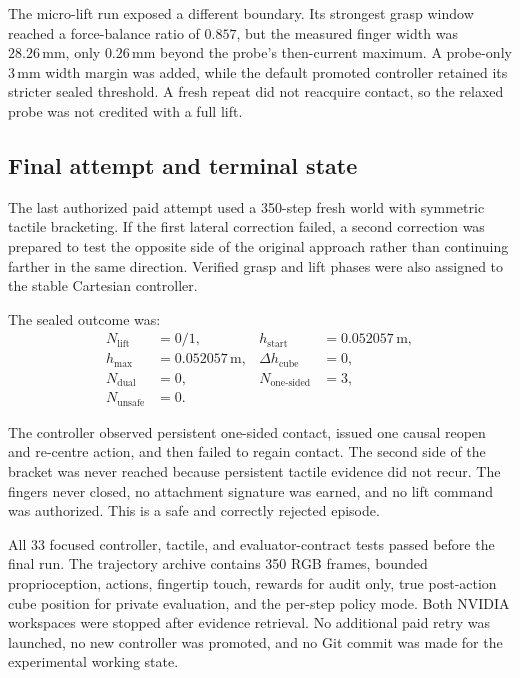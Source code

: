 The micro-lift run exposed a different boundary.  Its strongest grasp window
reached a force-balance ratio of $0.857$, but the measured finger width was
$28.26\,\mathrm{mm}$, only $0.26\,\mathrm{mm}$ beyond the probe's then-current
maximum.  A probe-only $3\,\mathrm{mm}$ width margin was added, while the
default promoted controller retained its stricter sealed threshold.  A fresh
repeat did not reacquire contact, so the relaxed probe was not credited with a
full lift.

\subsection{Final attempt and terminal state}

The last authorized paid attempt used a 350-step fresh world with symmetric
tactile bracketing.  If the first lateral correction failed, a second
correction was prepared to test the opposite side of the original approach
rather than continuing farther in the same direction.  Verified grasp and
lift phases were also assigned to the stable Cartesian controller.

The sealed outcome was:
\begin{align*}
N_{\mathrm{lift}} &= 0/1, &
h_{\mathrm{start}} &= 0.052057\,\mathrm{m},\\
h_{\mathrm{max}} &= 0.052057\,\mathrm{m}, &
\Delta h_{\mathrm{cube}} &= 0,\\
N_{\mathrm{dual}} &= 0, &
N_{\mathrm{one\mbox{-}sided}} &= 3,\\
N_{\mathrm{unsafe}} &= 0. &&
\end{align*}

The controller observed persistent one-sided contact, issued one causal reopen
and re-centre action, and then failed to regain contact.  The second side of
the bracket was never reached because persistent tactile evidence did not
recur.  The fingers never closed, no attachment signature was earned, and no
lift command was authorized.  This is a safe and correctly rejected episode.

All 33 focused controller, tactile, and evaluator-contract tests passed before
the final run.  The trajectory archive contains 350 RGB frames, bounded
proprioception, actions, fingertip touch, rewards for audit only, true
post-action cube position for private evaluation, and the per-step policy
mode.  Both NVIDIA workspaces were stopped after evidence retrieval.  No
additional paid retry was launched, no new controller was promoted, and no Git
commit was made for the experimental working state.

